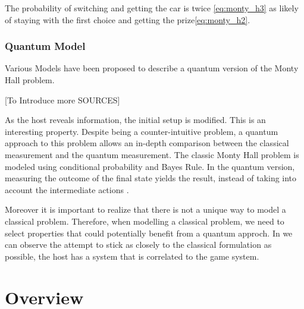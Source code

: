 The probability of switching and getting the car is twice \ref{eq:monty_h3} as likely of staying with the first choice and getting the prize\ref{eq:monty_h2}. 


\subsubsection{Quantum Model}

Various Models have been proposed to describe a quantum version of the Monty Hall problem.

[To Introduce more SOURCES]





As the host reveals information, the initial setup is modified. This is an interesting property. Despite being a counter-intuitive problem, a quantum approach to this problem allows an in-depth comparison between the classical measurement and the quantum measurement. The classic Monty Hall problem is modeled using conditional probability and Bayes Rule. In the quantum version, measuring the outcome of the final state yields the result, instead of taking into account the intermediate actions \cite{Fra2011}.

Moreover it is important to realize that there is not a unique way to model a classical problem\cite{Gill2002}. Therefore, when modelling a classical problem, we need to select properties that could potentially benefit from a quantum approch. In \cite{Gill2002} we can observe the attempt to stick as closely to the classical formulation as possible, the host has a system that is correlated to the game system.


\section{Overview}
\label{sec:related_work_overview}






